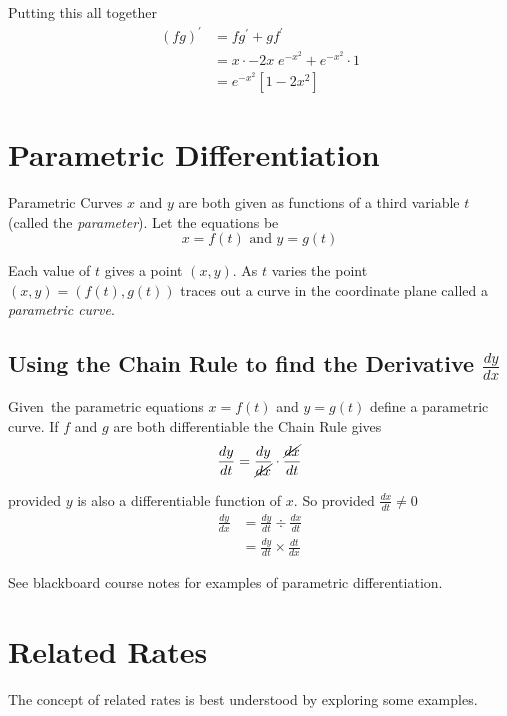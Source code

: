 Putting this all together
\begin{align*}\left (f g\right )^{ \prime } &  = f g^{ \prime } +g f^{ \prime } \\
 &  = x \cdot  -2 x\; e^{ -x^{2}} +e^{ -x^{2}} \cdot 1 \\
 &  = e^{ -x^{2}} \left [1 -2 x^{2}\right ]\end{align*}

\section{Parametric Differentiation}
Parametric Curves $x$ and $y$ are both given as functions of a third variable $t$ (called the \emph{parameter}). Let the equations be
\begin{equation*}x =f (t)\text{ and }y =g (t)
\end{equation*}

Each value of $t$ gives a point $(x ,y)$. As $t$ varies the point $(x ,y) =(f (t) ,g (t))$ traces out a curve in the coordinate plane called a \emph{parametric curve}. 


\subsection*{Using the Chain Rule to find the Derivative $\frac{d y}{d x}$}
Given\ the parametric equations $x =f (t)$ and $y =g (t)$ define a parametric curve. If $f$ and $g$ are both differentiable the Chain Rule gives
\begin{equation*}\frac{d y}{d t} =\frac{d y}{\cancel{d x}} \cdot \frac{\cancel{d x}}{d t}
\end{equation*}

provided $y$ is also a differentiable function of $x$. So provided $\frac{d x}{d t} \neq 0$
\begin{align*}\frac{d y}{d x} &  = \frac{d y}{d t} \div \frac{d x}{d t} \\
 &  = \frac{d y}{d t} \times \frac{d t}{d x}\end{align*}

\example See blackboard course notes for examples of parametric differentiation.
\section{Related Rates}
The concept of related rates is best understood by exploring some examples. 

